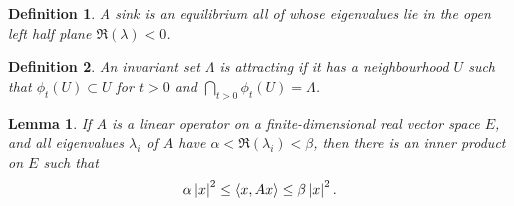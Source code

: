 \documentclass{notes}
\theoremstyle{plain}
\newtheorem*{definition}{Definition}
\newtheorem*{lemma}{Lemma}
\begin{document}
\begin{definition}
A sink is an equilibrium all of whose eigenvalues lie in the open left
half plane $\Re(\lambda) < 0$.
\end{definition}

\begin{definition}
An invariant set $\Lambda$ is attracting if it has a neighbourhood $U$ such
that $\phi_t(U) \subset U$ for $t > 0$ and $\bigcap_{t>0} \phi_t(U) = \Lambda$.
\end{definition}

\begin{lemma}
If $A$ is a linear operator on a finite-dimensional real vector space $E$, and
all eigenvalues $\lambda_i$ of $A$ have $\alpha < \Re (\lambda_i) < \beta$,
then there is an inner product on $E$ such that
\[
\alpha \left|x\right|^2 \le \langle x, Ax \rangle \le \beta \left|x\right|^2.
\]
\end{lemma}
\end{document}
